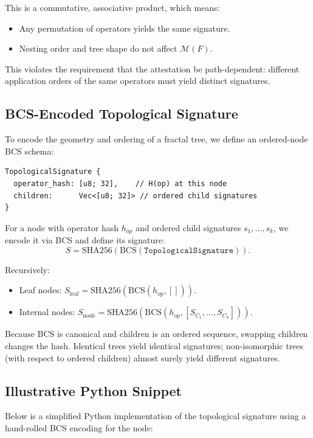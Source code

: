 \documentclass[11pt]{article}
\begin{document}
This is a commutative, associative product, which means:

\begin{itemize}[leftmargin=*]
  \item Any permutation of operators yields the same signature.
  \item Nesting order and tree shape do not affect \( \mathcal{M}(F) \).
\end{itemize}

This violates the requirement that the attestation be path-dependent: different application orders of the same operators must yield distinct signatures.

\subsection{BCS-Encoded Topological Signature}

To encode the geometry and ordering of a fractal tree, we define an ordered-node BCS schema:

\begin{verbatim}
TopologicalSignature {
  operator_hash: [u8; 32],    // H(op) at this node
  children:      Vec<[u8; 32]> // ordered child signatures
}
\end{verbatim}

For a node with operator hash \( h_{op} \) and ordered child signatures \( s_1, \dots, s_k \), we encode it via BCS and define its signature:
\[
  S = \mathrm{SHA256}(\mathrm{BCS}(\texttt{TopologicalSignature})).
\]

Recursively:
\begin{itemize}[leftmargin=*]
  \item Leaf nodes: \( S_{\text{leaf}} = \mathrm{SHA256}(\mathrm{BCS}(h_{op}, [])) \).
  \item Internal nodes: \( S_{\text{node}} = \mathrm{SHA256}(\mathrm{BCS}(h_{op}, [S_{C_1},\dots,S_{C_k}])) \).
\end{itemize}

Because BCS is canonical and \( \mathrm{children} \) is an ordered sequence, swapping children changes the hash. Identical trees yield identical signatures; non-isomorphic trees (with respect to ordered children) almost surely yield different signatures.

\subsection{Illustrative Python Snippet}

Below is a simplified Python implementation of the topological signature using a hand-rolled BCS encoding for the node:
\end{document}
